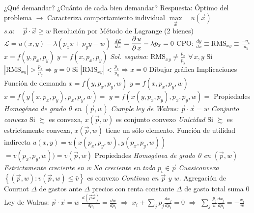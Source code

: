 \documentclass{nuevotema}
\begin{document}
\begin{esquemal}
				\4[] ¿Qué demandar?
				\4[] ¿Cuánto de cada bien demandar?
				\4 Respuesta:
				\4[] Óptimo del problema
				\4[] $\to$ Caracteriza comportamiento individual
				\4[] $\underset{\vec{x}}{\max} \quad u(\vec{x})$
				\4[] $s.a:\quad \vec{p} \cdot \vec{x} \geq w$
				\4 Resolución por Método de Lagrange (2 bienes)
				\4[] $\mathcal{L} = u(x,y) - \lambda (p_x x + p_y y - w)$
				\4[] $\frac{d \mathcal{L}}{dx} = \dfrac{\partial \, u}{\partial \, x} - \lambda p_x = 0 $
				\4[$\Rightarrow$] CPO: 
				\4[] $\frac{dy}{dx} \equiv \text{RMS}_{xy} \equiv \frac{- u_x}{u_y}$
				\4[$\Rightarrow$] $x = f(y,p_x, p_y)$
				\4[$\Rightarrow$] $y = f(x, p_x, p_y)$
				\4 \textit{Sol. esquina}:
				\4[] $\text{RMS}_{xy} \neq \frac{p_x}{p_y}$ $\forall \, x, y$
				\4[] Si $|\text{RMS}_{xy}| >  \frac{p_x}{p_y} \Rightarrow y=0$
				\4[] Si $|\text{RMS}_{xy}| < \frac{p_x}{p_y} \Rightarrow x=0$
				\4 Dibujar gráfica
		\2 Implicaciones
			\3 Función de demanda
				\4[] $x = f(y, p_x, p_y, w)$
				\4[] $y = f(x, p_x, p_y, w)$
				\4[$\Rightarrow$] $x = f(y(x, p_x, p_y), p_x, p_y, w) =$
				\4[] 
				\4[$\Rightarrow$] $y = f(x(y, p_x, p_y), p_x, p_y, w) = $
				\4[] 
				\4 Propiedades
				\4[(i)] \textit{Homogénea de grado 0 en $\left( \vec{p}, w \right)$}
				\4[(ii)] \textit{Cumple ley de Walras: $\vec{p} \cdot \vec{x} = w$}
				\4[(iii)] \textit{Conjunto convexo}
				\4[] Si $\succsim$ es convexa, $x(\vec{p},w)$ es conjunto convexo
				\4[(iii')] \textit{Unicidad}
				\4[] Si $\succsim$ es estrictamente convexa,
				\4[] $x(\vec{p},w)$ tiene un sólo elemento.
			\3 Función de utilidad indirecta
				\4[] $u (x, y) = u\left( x(p_x,p_y, w), y(p_x, p_y, w) \right)$
				\4[] $ =v(p_x, p_y, w)) = v(\vec{p}, w)$
				\4[] 
				\4 Propiedades
				\4[(i)] \textit{Homogénea de grado 0 en $\left( \vec{p}, w \right)$}
				\4[(ii)] \textit{Estrictamente creciente en w}
				\4[(iii)] \textit{No creciente en todo $p_i \in \vec{p}$}
				\4[(iv)] \textit{Cuasiconvexa}
				\4[] $\left\lbrace (\vec{p}, w): v( \vec{p},w) \leq \bar{v} \right\rbrace$ es convexo
				\4[(v)] \textit{Continua en $\vec{p}$ y $w$.}
			\3 Agregación de Cournot
				\4[] $\varDelta$ de gastos ante $\varDelta$ precios con renta constante
				\4[] $\varDelta$ de gasto total suma 0
				\4[] Ley de Walras: $\vec{p} \cdot \vec{x} = \bar{w}$
				\4[] $\frac{d(\vec{p} \vec{x})}{dp_i} = \frac{d \bar{w}}{dp_i}$
				\4[] $\Rightarrow$ $x_i +\sum_j p_j \frac{dx_j}{dp_i} = 0$
				\4[] $\Rightarrow$ $ \sum_j \frac{p_j}{w} \frac{dx_j}{dp_i}= -\frac{x_i}{w}$

\end{esquemal}
\end{document}
